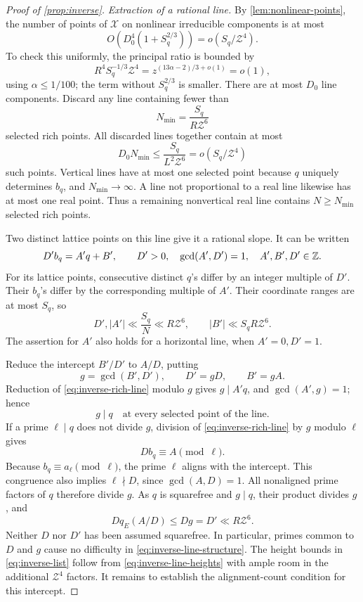 \begin{proof}[Proof of \cref{prop:inverse}]
\medskip
\emph{Extraction of a rational line.}
By \cref{lem:nonlinear-points}, the number of points of \(\mathcal X\)
on nonlinear irreducible components is at most
\[
 O\!\left(D_0^4(1+S_q^{2/3})\right)
 =o(S_q/\mathcal Z^4).
\]
To check this uniformly, the principal ratio is bounded by
\[
 R^4S_q^{-1/3}\mathcal Z^4
 =z^{(13\alpha-2)/3+o(1)}=o(1),
\]
using \(\alpha\le1/100\); the term without \(S_q^{2/3}\) is smaller.
There are at most \(D_0\) line components.
Discard any line containing fewer than
\[
 N_{\min}=\frac{S_q}{R\mathcal Z^6}
\]
selected rich points.
All discarded lines together contain at most
\[
 D_0N_{\min}\le\frac{S_q}{L^2\mathcal Z^6}
 =o(S_q/\mathcal Z^4)
\]
such points.
Vertical lines have at most one selected point because \(q\) uniquely
determines \(b_q\), and \(N_{\min}\to\infty\).
A line not proportional to a real line likewise has at most one real
point.  Thus a remaining nonvertical real line contains \(N\ge
N_{\min}\) selected rich points.

Two distinct lattice points on this line give it a rational slope.
It can be written
\begin{equation}
 D'b_q=A'q+B',\qquad
 D'>0,\quad \gcd(A',D')=1,\quad A',B',D'\in\mathbb Z.
 \label{eq:inverse-rich-line}
\end{equation}
For its lattice points, consecutive distinct \(q\)'s differ by an
integer multiple of \(D'\).  Their \(b_q\)'s differ by the corresponding
multiple of \(A'\).
Their coordinate ranges are at most \(S_q\), so
\begin{equation}
 D',|A'|\ll \frac{S_q}{N}\ll R\mathcal Z^6,
 \qquad
 |B'|\ll S_qR\mathcal Z^6.
 \label{eq:inverse-line-heights}
\end{equation}
The assertion for \(A'\) also holds for a horizontal line, when
\(A'=0,D'=1\).

Reduce the intercept \(B'/D'\) to \(A/D\), putting
\[
 g=\gcd(B',D'),\qquad D'=gD,\qquad B'=gA.
\]
Reduction of \eqref{eq:inverse-rich-line} modulo \(g\) gives
\(g\mid A'q\), and \(\gcd(A',g)=1\); hence
\begin{equation}
 g\mid q
 \quad\text{at every selected point of the line}.
 \label{eq:inverse-g-divides}
\end{equation}
If a prime \(\ell\mid q\) does not divide \(g\), division of
\eqref{eq:inverse-rich-line} by \(g\) modulo \(\ell\) gives
\[
 D b_q\equiv A\pmod\ell.
\]
Because \(b_q\equiv a_\ell\pmod\ell\), the prime \(\ell\) aligns with
the intercept.  This congruence also implies \(\ell\nmid D\), since
\(\gcd(A,D)=1\).
All nonaligned prime factors of \(q\) therefore divide \(g\).
As \(q\) is squarefree and \(g\mid q\), their product divides \(g\),
and
\begin{equation}
 Dq_E(A/D)\le Dg=D'\ll R\mathcal Z^6.
 \label{eq:inverse-line-structure}
\end{equation}
Neither \(D\) nor \(D'\) has been assumed squarefree.
In particular, primes common to \(D\) and \(g\) cause no difficulty in
\eqref{eq:inverse-line-structure}.
The height bounds in \eqref{eq:inverse-list} follow from
\eqref{eq:inverse-line-heights} with ample room in the additional
\(\mathcal Z^4\) factors.
It remains to establish the alignment-count condition for this
intercept.


\end{proof}
